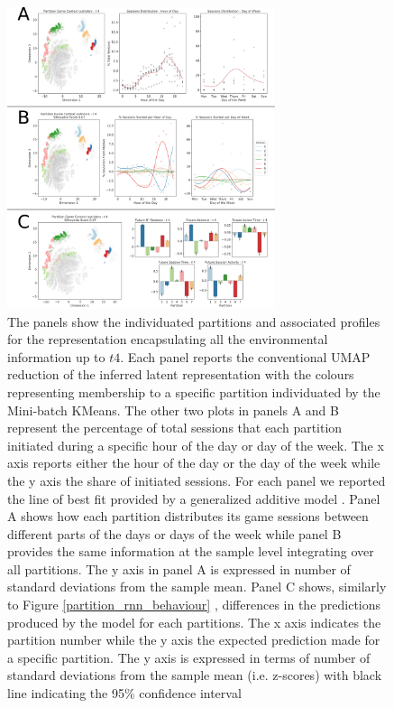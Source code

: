 \begin{figure}[ht]
\includegraphics[width=0.7\textwidth]{images/chapter_4/clust_env.png}
\centering
\caption[Partitions of the representations generated by the RNN architectures using the environmental metrics]{The panels show the individuated partitions and associated profiles for the representation encapsulating all the environmental information up to $t4$. Each panel reports the conventional UMAP reduction of the inferred latent representation with the colours representing membership to a specific partition individuated by the Mini-batch KMeans. The other two plots in panels A and B represent the percentage of total sessions that each partition initiated during a specific hour of the day or day of the week. The x axis reports either the hour of the day or the day of the week while the y axis the share of initiated sessions. For each panel we reported the line of best fit provided by a generalized additive model \cite{serven2018}. Panel A shows how each partition distributes its game sessions between different parts of the days or days of the week while panel B provides the same information at the sample level integrating over all partitions. The y axis in panel A is expressed in number of standard deviations from the sample mean. Panel C shows, similarly to Figure \ref{partition_rnn_behaviour} , differences in the predictions produced by the model for each partitions. The x axis indicates the partition number while the y axis the expected prediction made for a specific partition. The y axis is expressed in terms of number of standard deviations from the sample mean (i.e. z-scores) with black line indicating the 95\% confidence interval}
\label{partition_rnn_env} 
\end{figure}

